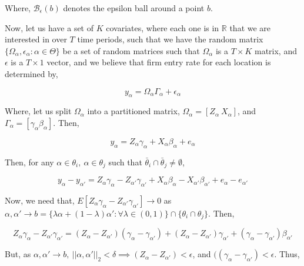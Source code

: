 \documentclass{article}
\begin{document}
Where, $\mathcal{B}_{\epsilon}(b)$ denotes the epsilon ball around a point $b$.

Now, let us have a set of $K$ covariates, where each one is in $\mathbb{R}$ that we are interested in over $T$ time periods, such that we have the random matrix $\{\Omega_{\alpha},\epsilon_{\alpha}: \alpha \in \Theta\}$ be a set of random matrices such that $\Omega_{\alpha}$ is a $T \times K$ matrix, and $\epsilon$ is a $T \times 1$ vector, and we believe that firm entry rate for each location is determined by,

$$y_{\alpha} = \Omega_{\alpha}\Gamma_{\alpha}+\epsilon_{\alpha}$$
  
  Where, let us split $\Omega_{\alpha}$ into a partitioned matrix, $\Omega_{\alpha} = [Z_{\alpha}\ X_{\alpha}]$, and $\Gamma_{\alpha} = [\gamma_{\alpha} \beta_{\alpha}]$. Then,

$$y_{\alpha} = Z_{\alpha}\gamma_{\alpha}+X_{\alpha}\beta_{\alpha}+e_{\alpha}$$
  
  Then, for any $\alpha \in \theta_{i},\ \alpha \in \theta_{j}$ such that $\bar \theta_{i} \cap \bar \theta_{j} \not = \emptyset$,
  
 

$$y_{\alpha}-y_{\alpha'} = Z_{\alpha}\gamma_{\alpha}-Z_{\alpha'}\gamma_{\alpha'}+X_{\alpha}\beta_{\alpha}-X_{\alpha'}\beta_{\alpha'}+e_{\alpha}-e_{\alpha'}$$
  
  Now, we need that, $E[Z_{\alpha}\gamma_{\alpha}-Z_{\alpha'}\gamma_{\alpha'}] \to 0$ as $\alpha,\alpha' \to b = \{\lambda \alpha + (1-\lambda)\alpha': \forall \lambda \in (0,1)\}\cap \{\theta_{i} \cap \theta_{j}\}$. Then,

$$Z_{\alpha}\gamma_{\alpha}-Z_{\alpha'}\gamma_{\alpha'} = (Z_{\alpha} - Z_{\alpha'})(\gamma_{\alpha}-\gamma_{\alpha'}) + (Z_{\alpha} - Z_{\alpha'})\gamma_{\alpha'} + (\gamma_{\alpha}-\gamma_{\alpha'})\beta_{\alpha'}$$
                                                                                                                                                                         
                                                                                                                                                                         But, as $\alpha, \alpha' \to b,\ ||\alpha,\alpha'||_{2} < \delta \implies (Z_{\alpha} - Z_{\alpha'}) < \epsilon$, and $((\gamma_{\alpha}-\gamma_{\alpha'}) < \epsilon $. Thus,
                                                                                                                                                                       
\end{document}
